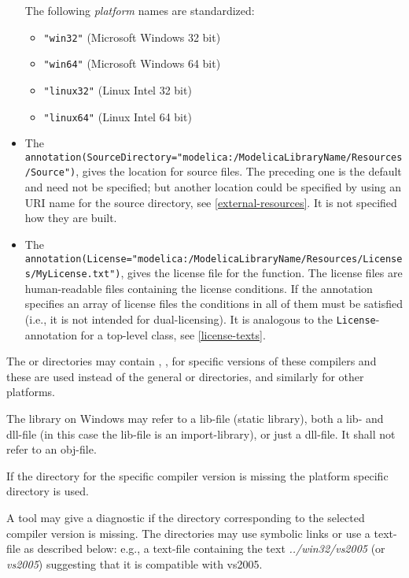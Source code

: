 \begin{itemize}
  The following \emph{platform} names are standardized:
  \begin{itemize}
  \item
    {\lstinline!"win32"!} (Microsoft Windows 32 bit)
  \item
    {\lstinline!"win64"!} (Microsoft Windows 64 bit)
  \item
    {\lstinline!"linux32"!} (Linux Intel 32 bit)
  \item
    {\lstinline!"linux64"!} (Linux Intel 64 bit)
  \end{itemize}
\item
  The
  {\lstinline!annotation(SourceDirectory="modelica:/ModelicaLibraryName/Resources/Source")!}, gives the location for source files.
  The preceding one is the default and need not be specified; but another location could be specified by using an URI name for the source directory, see \cref{external-resources}.
  It is not specified how they are built.
\item
  The {\lstinline!annotation(License="modelica:/ModelicaLibraryName/Resources/Licenses/MyLicense.txt")!}, gives the license file for the function.
  The license files are human-readable files containing the license conditions.
  If the annotation specifies an array of license files the conditions in all of them must be satisfied (i.e., it is not intended for dual-licensing).
  It is analogous to the \lstinline!License!-annotation for a top-level class, see \cref{license-texts}.
\end{itemize}

The  or  directories may contain , , 
for specific versions of these compilers and these are used instead of
the general  or  directories, and similarly for other
platforms.

The library on Windows may refer to a lib-file (static library), both a lib- and dll-file (in this case the lib-file is an import-library),
or just a dll-file. It shall not refer to an obj-file.

If the directory for the specific compiler version is missing the
platform specific directory is used.

\begin{nonnormative}
A tool may give a diagnostic if the directory corresponding to the selected compiler version is missing.
The directories may use symbolic links or use a text-file as described below: e.g., a text-file  containing the text \emph{../win32/vs2005} (or \emph{vs2005}) suggesting that it is compatible with vs2005.
\end{nonnormative}


